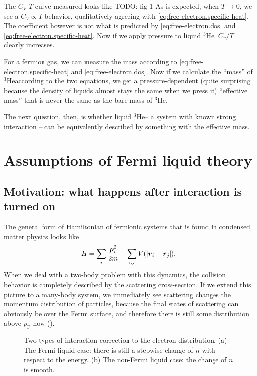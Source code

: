 \documentclass[hyperref, a4paper]{article}
\newcommand*{\pfermi}{p_{\text{F}}}
\newcommand*{\hethree}{$^3$He}
\begin{document}
The $C_V$-$T$ curve measured looks like TODO: fig 1 
As is expected, 
when $T \to 0$, 
we see a $C_V \propto T$ behavior, 
qualitatively agreeing with \eqref{eq:free-electron.specific-heat}.
The coefficient however is not what is predicted by 
\eqref{eq:free-electron.dos} and
\eqref{eq:free-electron.specific-heat}.
Now if we apply pressure to liquid \hethree, 
$C_v / T$ clearly increases. 

For a fermion gas, 
we can measure the mass according to \eqref{eq:free-electron.specific-heat}
and \eqref{eq:free-electron.dos}. 
Now if we calculate the ``mass'' of \hethree according to the two equations, 
we get a pressure-dependent 
(quite surprising because the density of liquids almost stays the same when we press it)
``effective mass''
that is never the same as the bare mass of \hethree.

The next question, then, 
is whether liquid \hethree -- 
a system with known strong interaction -- 
can be equivalently described 
by something with the effective mass. 

\section{Assumptions of Fermi liquid theory}

\subsection{Motivation: what happens after interaction is turned on}

The general form of Hamiltonian of fermionic systems 
that is found in condensed matter physics looks like 
\begin{equation}
    H = \sum_i \frac{\vb*{p}_i^2}{2m} + 
    \sum_{i, j} V(\abs{\vb*{r}_i - \vb*{r}_j}).
\end{equation}
When we deal with a two-body problem with this dynamics, 
the collision behavior is completely described
by the scattering cross-section. 
If we extend this picture to a many-body system,
we immediately see scattering changes 
the momentum distribution of particles, 
because the final states of scattering 
can obviously be over the Fermi surface, 
and therefore there is still some distribution above $\pfermi$ now
(). 

\begin{figure}
    \centering
    
    \caption{Two types of interaction correction to the electron distribution.
    (a) The Fermi liquid case: there is still a stepwise change of $n$ with respect to the energy.
    (b) The non-Fermi liquid case: the change of $n$ is smooth.}
    \label{fig:fermi-liquid-distribution}
\end{figure}
\end{document}
